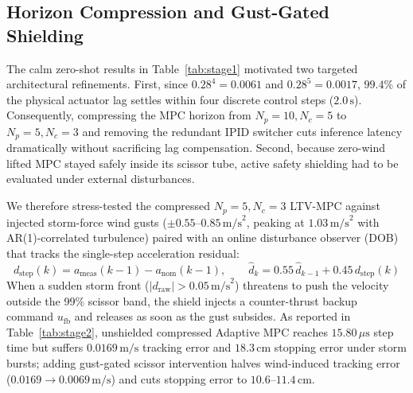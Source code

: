 \documentclass[10pt,a4paper]{article}
\begin{document}
\subsection{Horizon Compression and Gust-Gated Shielding}
The calm zero-shot results in Table~\ref{tab:stage1} motivated two targeted architectural refinements. First, since $0.28^4 = 0.0061$ and $0.28^5 = 0.0017$, $99.4\%$ of the physical actuator lag settles within four discrete control steps ($2.0\,\text{s}$). Consequently, compressing the MPC horizon from $N_p=10, N_c=5$ to $N_p=5, N_c=3$ and removing the redundant IPID switcher cuts inference latency dramatically without sacrificing lag compensation. Second, because zero-wind lifted MPC stayed safely inside its scissor tube, active safety shielding had to be evaluated under external disturbances.

We therefore stress-tested the compressed $N_p=5, N_c=3$ LTV-MPC against injected storm-force wind gusts ($\pm 0.55\text{--}0.85\,\text{m/s}^2$, peaking at $1.03\,\text{m/s}^2$ with AR(1)-correlated turbulence) paired with an online disturbance observer (DOB) that tracks the single-step acceleration residual:
\begin{equation}
d_{\text{step}}(k) = a_{\text{meas}}(k-1) - a_{\text{nom}}(k-1), \qquad \hat{d}_k = 0.55\,\hat{d}_{k-1} + 0.45\,d_{\text{step}}(k)
\label{eq:dob}
\end{equation}
When a sudden storm front ($|d_{\text{raw}}| > 0.05\,\text{m/s}^2$) threatens to push the velocity outside the 99\% scissor band, the shield injects a counter-thrust backup command $u_{\text{fb}}$ and releases as soon as the gust subsides. As reported in Table~\ref{tab:stage2}, unshielded compressed Adaptive MPC reaches $15.80\,\mu\text{s}$ step time but suffers $0.0169\,\text{m/s}$ tracking error and $18.3\,\text{cm}$ stopping error under storm bursts; adding gust-gated scissor intervention halves wind-induced tracking error ($0.0169 \to 0.0069\,\text{m/s}$) and cuts stopping error to $10.6\text{--}11.4\,\text{cm}$.
\end{document}

